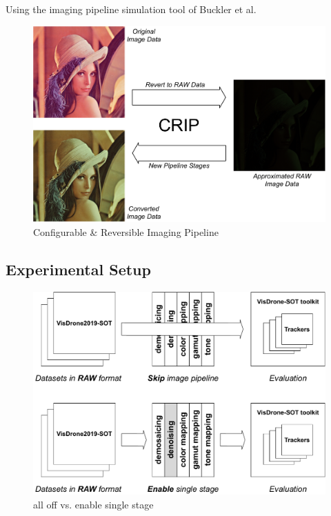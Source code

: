 \documentclass{beamer}
\begin{document}
\begin{frame}

    Using the imaging pipeline simulation tool of Buckler et al.
    
    \begin{figure}[htpb]
        \begin{center}
            \includegraphics[width=0.65\linewidth]{fig/crip.pdf}
            \caption{Configurable \& Reversible Imaging Pipeline}
        \end{center}
    \end{figure}
\end{frame}

\subsection{Experimental Setup}

\begin{frame}
    \begin{figure}[htpb]
        \begin{center}
            \includegraphics[width=0.8\linewidth]{fig/eva.pdf}
            \caption{all off vs. enable single stage}
        \end{center}
    \end{figure}
\end{frame}
\end{document}
